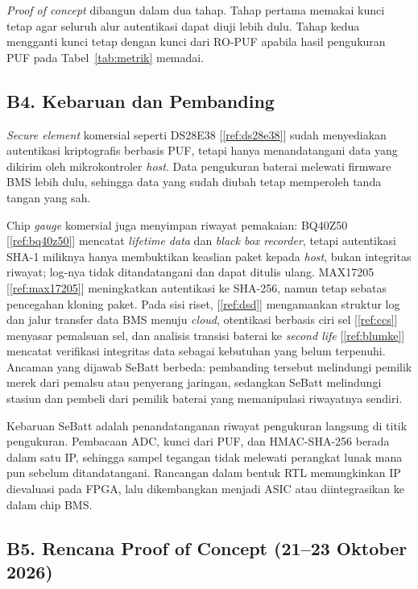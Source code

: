 \documentclass[11pt,a4paper]{article}
\newcommand{\rujuk}[1]{[\ref{#1}]}   %
\begin{document}
\textit{Proof of concept} dibangun dalam dua tahap. Tahap pertama memakai kunci tetap agar seluruh alur autentikasi dapat diuji lebih dulu. Tahap kedua mengganti kunci tetap dengan kunci dari RO-PUF apabila hasil pengukuran PUF pada Tabel~\ref{tab:metrik} memadai.

\subsection{B4. Kebaruan dan Pembanding}

\textit{Secure element} komersial seperti DS28E38 \rujuk{ref:ds28e38} sudah menyediakan autentikasi kriptografis berbasis PUF, tetapi hanya menandatangani data yang dikirim oleh mikrokontroler \textit{host}. Data pengukuran baterai melewati firmware BMS lebih dulu, sehingga data yang sudah diubah tetap memperoleh tanda tangan yang sah.

Chip \textit{gauge} komersial juga menyimpan riwayat pemakaian: BQ40Z50 \rujuk{ref:bq40z50} mencatat \textit{lifetime data} dan \textit{black box recorder}, tetapi autentikasi SHA-1 miliknya hanya membuktikan keaslian paket kepada \textit{host}, bukan integritas riwayat; log-nya tidak ditandatangani dan dapat ditulis ulang. MAX17205 \rujuk{ref:max17205} meningkatkan autentikasi ke SHA-256, namun tetap sebatas pencegahan kloning paket. Pada sisi riset, \rujuk{ref:dsd} mengamankan struktur log dan jalur transfer data BMS menuju \textit{cloud}, otentikasi berbasis ciri sel \rujuk{ref:ccs} menyasar pemalsuan sel, dan analisis transisi baterai ke \textit{second life} \rujuk{ref:blumke} mencatat verifikasi integritas data sebagai kebutuhan yang belum terpenuhi. Ancaman yang dijawab SeBatt berbeda: pembanding tersebut melindungi pemilik merek dari pemalsu atau penyerang jaringan, sedangkan SeBatt melindungi stasiun dan pembeli dari pemilik baterai yang memanipulasi riwayatnya sendiri.

Kebaruan SeBatt adalah penandatanganan riwayat pengukuran langsung di titik pengukuran. Pembacaan ADC, kunci dari PUF, dan HMAC-SHA-256 berada dalam satu IP, sehingga sampel tegangan tidak melewati perangkat lunak mana pun sebelum ditandatangani. Rancangan dalam bentuk RTL memungkinkan IP dievaluasi pada FPGA, lalu dikembangkan menjadi ASIC atau diintegrasikan ke dalam chip BMS.

\subsection{B5. Rencana Proof of Concept (21--23 Oktober 2026)}
\end{document}
